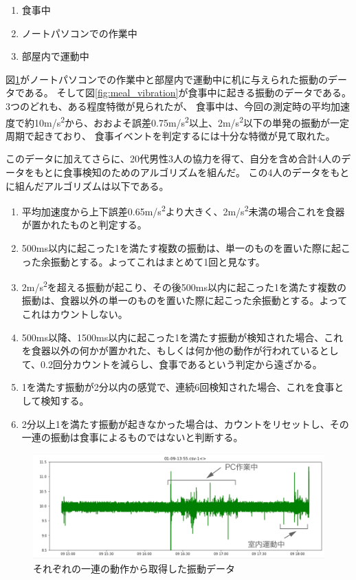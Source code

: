 \begin{enumerate}
  \item 食事中
  \item ノートパソコンでの作業中
  \item 部屋内で運動中
\end{enumerate}

図\ref{fig:activities_vibration}がノートパソコンでの作業中と部屋内で運動中に机に与えられた振動のデータである。
そして図\ref{fig:meal_vibration}が食事中に起きる振動のデータである。3つのどれも、ある程度特徴が見られたが、
食事中は、今回の測定時の平均加速度で約10\si{m/s^{2}}から、おおよそ誤差0.75\si{m/s^{2}}以上、2\si{m/s^{2}}以下の単発の振動が一定周期で起きており、
食事イベントを判定するには十分な特徴が見て取れた。

このデータに加えてさらに、20代男性3人の協力を得て、自分を含め合計4人のデータをもとに食事検知のためのアルゴリズムを組んだ。
この4人のデータをもとに組んだアルゴリズムは以下である。

\begin{enumerate}
  \item 平均加速度から上下誤差0.65\si{m/s^{2}}より大きく、2\si{m/s^{2}}未満の場合これを食器が置かれたものと判定する。
  \item 500ms以内に起こった1を満たす複数の振動は、単一のものを置いた際に起こった余振動とする。よってこれはまとめて1回と見なす。
  \item 2\si{m/s^2}を超える振動が起こり、その後500ms以内に起こった1を満たす複数の振動は、食器以外の単一のものを置いた際に起こった余振動とする。よってこれはカウントしない。
  \item 500ms以降、1500ms以内に起こった1を満たす振動が検知された場合、これを食器以外の何かが置かれた、もしくは何か他の動作が行われているとして、0.2回分カウントを減らし、食事であるという判定から遠ざかる。
  \item 1を満たす振動が2分以内の感覚で、連続6回検知された場合、これを食事として検知する。
  \item 2分以上1を満たす振動が起きなかった場合は、カウントをリセットし、その一連の振動は食事によるものではないと判断する。
\end{enumerate}

\begin{figure}[htbp]
  \caption{それぞれの一連の動作から取得した振動データ}
  \label{fig:activities_vibration}
  \begin{center}
    \includegraphics[bb=0 0 1200 300,width=20cm]{assets/pc_task_n_exercise.png}
  \end{center}
\end{figure}

